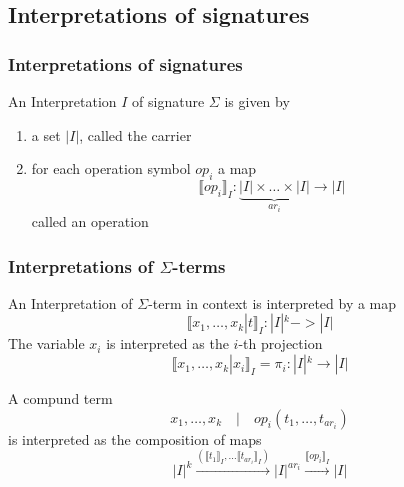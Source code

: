 \documentclass{beamer}
\begin{document}
\subsection{Interpretations of signatures}

\begin{frame}
    \frametitle{Interpretations of signatures}
    \begin{definition}
        An Interpretation $I$ of signature $\Sigma$ is given by
        \begin{enumerate}
            \item a set $|I|$, called the carrier
            \item for each operation symbol $op_i$ a map
                \[
                    \llbracket op_i \rrbracket_I : \underbrace{|I| \times \ldots \times |I|}_{ar_i} \rightarrow  |I|
                \]
            called an operation
        \end{enumerate}
    \end{definition}

\end{frame}

\begin{frame}
    \frametitle{Interpretations of $\Sigma$-terms}
    \begin{definition}
        An Interpretation of $\Sigma$-term in context is interpreted by a map
        \[
          \llbracket x_1, \ldots , x_k  | t \rrbracket_I : |I|^k -> |I|
        \]
  The variable $x_i$ is interpreted as the $i$-th projection
            \[
                \llbracket x_1, \ldots , x_k  | x_i \rrbracket_I = \pi_i : |I|^k \rightarrow |I|
            \]

A compund term 
                \[
                    x_1, \ldots , x_k \quad  | \quad op_i(t_1, \ldots , t_{ar_i}  )
                \]
                is interpreted as the composition of maps 
                \[
                    |I|^k \xrightarrow{(\llbracket t_1\rrbracket_I, 
                    \ldots {\llbracket t_{ar_i}\rrbracket_I}) } |I|^{ar_i} \xrightarrow{
                        \llbracket op_i \rrbracket_I} |I|
                \]



    \end{definition}
\end{frame}
\end{document}

